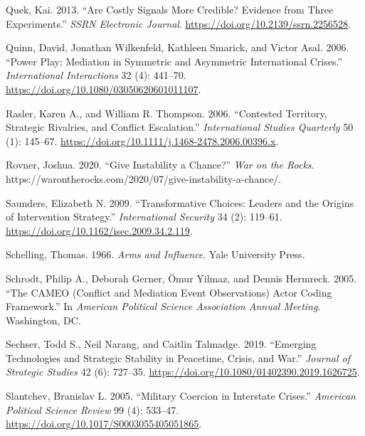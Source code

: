 \documentclass[
]{article}
\newlength{\cslhangindent}
\newlength{\cslentryspacingunit} %
\newenvironment{CSLReferences}[2] %
 {%
  \setlength{\parindent}{0pt}
  \ifodd #1
  \let\oldpar\par
  \def\par{\hangindent=\cslhangindent\oldpar}
  \fi
  \setlength{\parskip}{#2\cslentryspacingunit}
 }%
 {}
\begin{document}
\begin{CSLReferences}{1}{0}
\leavevmode{}%
Quek, Kai. 2013. {``Are {Costly Signals More Credible}? {Evidence} from {Three Experiments}.''} \emph{SSRN Electronic Journal}. \url{https://doi.org/10.2139/ssrn.2256528}.

\leavevmode{}%
Quinn, David, Jonathan Wilkenfeld, Kathleen Smarick, and Victor Asal. 2006. {``Power {Play}: {Mediation} in {Symmetric} and {Asymmetric International Crises}.''} \emph{International Interactions} 32 (4): 441--70. \url{https://doi.org/10.1080/03050620601011107}.

\leavevmode{}%
Rasler, Karen A., and William R. Thompson. 2006. {``Contested {Territory}, {Strategic Rivalries}, and {Conflict Escalation}.''} \emph{International Studies Quarterly} 50 (1): 145--67. \url{https://doi.org/10.1111/j.1468-2478.2006.00396.x}.

\leavevmode{}%
Rovner, Joshua. 2020. {``Give {Instability} a {Chance}?''} \emph{War on the Rocks}. https://warontherocks.com/2020/07/give-instability-a-chance/.

\leavevmode{}%
Saunders, Elizabeth N. 2009. {``Transformative {Choices}: {Leaders} and the {Origins} of {Intervention Strategy}.''} \emph{International Security} 34 (2): 119--61. \url{https://doi.org/10.1162/isec.2009.34.2.119}.

\leavevmode{}%
Schelling, Thomas. 1966. \emph{Arms and {Influence}}. {Yale University Press}.

\leavevmode{}%
Schrodt, Philip A., Deborah Gerner, Ömur Yilmaz, and Dennis Hermreck. 2005. {``The {CAMEO} ({Conflict} and {Mediation Event Observations}) {Actor Coding Framework}.''} In \emph{American {Political Science Association Annual Meeting}}. {Washington, DC}.

\leavevmode{}%
Sechser, Todd S., Neil Narang, and Caitlin Talmadge. 2019. {``Emerging Technologies and Strategic Stability in Peacetime, Crisis, and War.''} \emph{Journal of Strategic Studies} 42 (6): 727--35. \url{https://doi.org/10.1080/01402390.2019.1626725}.

\leavevmode{}%
Slantchev, Branislav L. 2005. {``Military {Coercion} in {Interstate Crises}.''} \emph{American Political Science Review} 99 (4): 533--47. \url{https://doi.org/10.1017/S0003055405051865}.


\end{CSLReferences}
\end{document}
